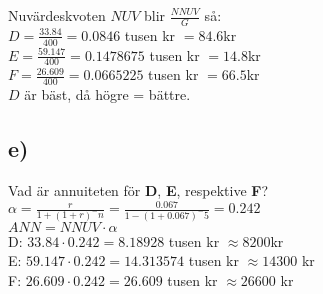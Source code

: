 \documentclass[a4paper, titlepage,12pt]{article}
\begin{document}
		Nuvärdeskvoten $NUV$ blir $\frac{NNUV}{G}$ så:\\

		$D = \frac{33.84}{400} = 0.0846$ tusen kr $= 84.6$kr\\

		$E = \frac{59.147}{400} = 0.1478675$ tusen kr $= 14.8$kr\\

		$F = \frac{26.609}{400} = 0.0665225$ tusen kr $= 66.5$kr\\

		$D$ är bäst, då högre = bättre.\\

		\subsection*{e)} Vad är annuiteten för \textbf{D}, \textbf{E}, respektive \textbf{F}?\\

		$\alpha = \frac{r}{1 + (1 + r)^-n} = \frac{0.067}{1-(1+0.067)^-5} = 0.242$\\

		$ANN = NNUV \cdot \alpha$\\

		D: $33.84 \cdot 0.242 = 8.18928$ tusen kr $\approx 8200$kr\\

		E: $59.147 \cdot 0.242 = 14.313574$ tusen kr $\approx 14 300$ kr\\

		F: $26.609 \cdot 0.242 = 26.609$ tusen kr $\approx 26 600$ kr\\
\end{document}
